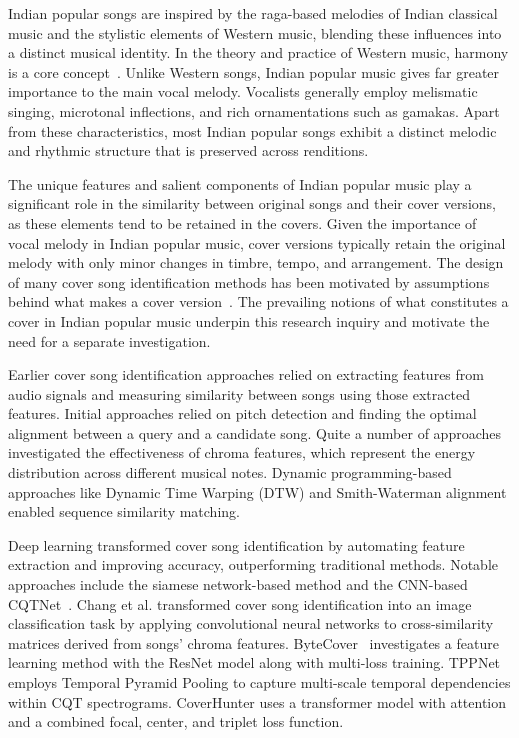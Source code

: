 \documentclass[conference]{IEEEtran}
\begin{document}
Indian popular songs are inspired by the raga-based melodies of Indian classical music and the stylistic elements of Western music, blending these influences into a distinct musical identity. In the theory and practice of Western music, harmony is a core concept~\cite{ismir_paper}. Unlike Western songs, Indian popular music gives far greater importance to the main vocal melody. Vocalists generally employ melismatic singing, microtonal inflections, and rich ornamentations such as gamakas. Apart from these characteristics, most Indian popular songs exhibit a distinct melodic and rhythmic structure that is preserved across renditions.

The unique features and salient components of Indian popular music play a significant role in the similarity between original songs and their cover versions, as these elements tend to be retained in the covers. Given the importance of vocal melody in Indian popular music, cover versions typically retain the original melody with only minor changes in timbre, tempo, and arrangement. The design of many cover song identification methods has been motivated by assumptions behind what makes a cover version~\cite{ismir_paper}. The prevailing notions of what constitutes a cover in Indian popular music underpin this research inquiry and motivate the need for a separate investigation.

Earlier cover song identification approaches relied on extracting features from audio signals and measuring similarity between songs using those extracted features. Initial approaches relied on pitch detection and finding the optimal alignment between a query and a candidate song. Quite a number of approaches investigated the effectiveness of chroma features, which represent the energy distribution across different musical notes. Dynamic programming-based approaches like Dynamic Time Warping (DTW) and Smith-Waterman alignment enabled sequence similarity matching.

Deep learning transformed cover song identification by automating feature extraction and improving accuracy, outperforming traditional methods. Notable approaches include the siamese network-based method and the CNN-based CQTNet~\cite{yu2020cqtnet}. Chang et al. transformed cover song identification into an image classification task by applying convolutional neural networks to cross-similarity matrices derived from songs' chroma features. ByteCover~\cite{du2021bytecover} investigates a feature learning method with the ResNet model along with multi-loss training. TPPNet~\cite{xu2019tppnet} employs Temporal Pyramid Pooling to capture multi-scale temporal dependencies within CQT spectrograms. CoverHunter uses a transformer model with attention and a combined focal, center, and triplet loss function.
\end{document}

